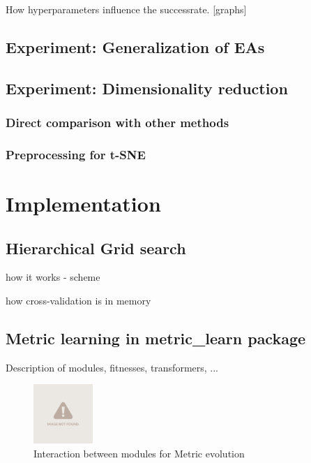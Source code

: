 \documentclass[12pt,a4paper]{report}
\begin{document}
How hyperparameters influence the successrate. [graphs]


\section{Experiment: Generalization of EAs} \label{chap:experiment-fitness}


\section{Experiment: Dimensionality reduction} \label{chap:experiment-dim-reduction}

\subsection{Direct comparison with other methods}

\subsection{Preprocessing for t-SNE}


\chapter{Implementation} \label{chap:implementation}

\section{Hierarchical Grid search}

how it works - scheme

how cross-validation is in memory

\section{Metric learning in metric\_learn package}

Description of modules, fitnesses, transformers, ...

\begin{figure}[h!] \label{fig:implementation-modules}
	\centering
    \includegraphics[width=0.2\textwidth]{img/notfound}
    \caption{Interaction between modules for Metric evolution}
\end{figure}
\end{document}
